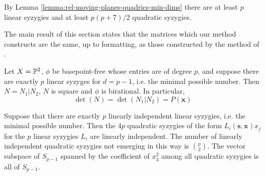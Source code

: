 \documentclass[fleqn,reqno]{amsart}
\numberwithin{first}{chapter}
\numberwithin{section}{chapter}
\numberwithin{equation}{first}
\begin{document}
\begin{remark}
	\label{rem:rel-moving-planes-quadrics-num-syz}
	By Lemma \ref{lemma:rel-moving-planes-quadrics-min-dims} there are
	at least $p$ linear syzygies and at least $p(p+7)/2$ quadratic syzygies.
\end{remark}

\begin{paragraph*}
	The main result of this section states that the matrices which our method constructs
	are the same, up to formatting, as those constructed by the method of \citet{00-CGZ-JSC}.
\end{paragraph*}

\begin{theorem}
	\label{thm:rel-moving-planes-quadrics}
	Let $X=\mathbb{P}^2$, $\phi$ be basepoint-free whose entries are of degree $p$,
	and suppose there are exactly $p$ linear syzyges for $d=p-1$, i.e. the minimal possible number.
	Then $N=N_1|N_2$, $N$ is square and $\phi$ is birational. In particular,
	\[
		\det(N)=\det(N_1|N_2)=P(\mathbf x)
	\]
\end{theorem}

\begin{lemma}
	\label{lemma:rel-moving-planes-quadrics-main}
	Suppose that there are exactly $p$ linearly independent linear syzygies, i.e. the minimal possible number.
	Then the $4p$ quadratic syzygies of the form $L_i(\mathbf s,\mathbf x)x_j$ for the $p$ linear syzygies $L_i$
	are linearly independent. The number of linearly independent quadratic syzygies not emerging in this way
	is $\binom{p}{2}$. The vector subspace of $S_{p-1}$ spanned by the coefficient of $x_3^2$ among all
	quadratic syzygies is all of $S_{p-1}$.
\end{lemma}
\end{document}
